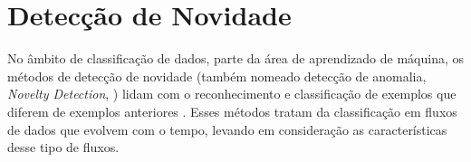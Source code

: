 






\section{Detecção de Novidade}\label{sec:nd}

\newcommand{\novelty}{\emph{Novelty Detection}\xspace}
\newcommand{\drift}{\emph{Concept Drift}\xspace}
\newcommand{\evolution}{\emph{Concept Evolution}\xspace}

No âmbito de classificação de dados, parte da área de aprendizado de máquina, os
métodos de detecção de novidade (também nomeado detecção de anomalia, \novelty,
\nd) lidam com o reconhecimento e classificação de exemplos que diferem de
exemplos anteriores \cite{PERNER2007,Gama2010}.
Esses métodos tratam da classificação em fluxos de dados que evolvem com o
tempo, levando em consideração as características desse tipo de fluxos.


